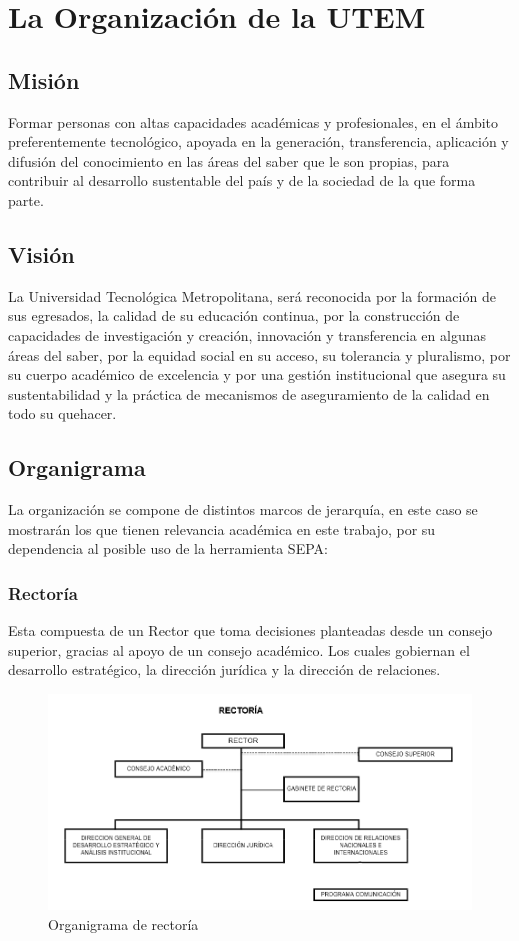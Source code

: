 \documentclass[a4paper,12pt,openany,oneside]{book}
\begin{document}
\chapter{La Organización de la UTEM}
\thispagestyle{empty}
\section{Misión}
Formar personas con altas capacidades académicas y profesionales, en el ámbito preferentemente tecnológico, apoyada en la generación, transferencia, aplicación y difusión del conocimiento en las áreas del saber que le son propias, para contribuir al desarrollo sustentable del país y de la sociedad de la que forma parte.
\section{Visión}
La Universidad Tecnológica Metropolitana, será reconocida por la formación de sus egresados, la calidad de su educación continua, por la construcción de capacidades de investigación y creación, innovación y transferencia en algunas áreas del saber, por la equidad social en su acceso, su tolerancia y pluralismo, por su cuerpo académico de excelencia y por una gestión institucional que asegura su sustentabilidad y la práctica de mecanismos de aseguramiento de la calidad en todo su quehacer.
\section{Organigrama}
La organización se compone de distintos marcos de jerarquía, en este caso se mostrarán los que tienen relevancia académica en este trabajo, por su dependencia al posible uso de la herramienta SEPA:
\subsection{Rectoría}
Esta compuesta de un Rector que toma decisiones planteadas desde un consejo superior, gracias al apoyo de un consejo académico. Los cuales gobiernan el desarrollo estratégico, la dirección jurídica y la dirección de relaciones.
\begin{figure}[!hbp]
\begin{center}
\includegraphics[scale=0.6,angle=0]{images/organigrama/1.png}
\caption{Organigrama de rector\'ia}
\label{Organigrama de rectoria}
\end{center}
\end{figure}
\end{document}
